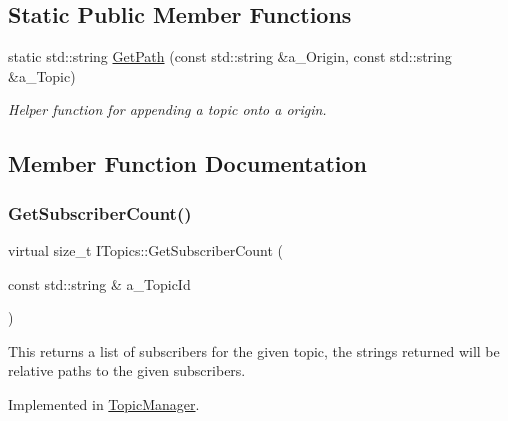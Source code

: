 \subsection*{Static Public Member Functions}
\begin{DoxyCompactItemize}
\item 
\mbox{\label{class_i_topics_a73be27c489a5f26e044e2da65979613f}} 
static std\+::string \hyperlink{class_i_topics_a73be27c489a5f26e044e2da65979613f}{Get\+Path} (const std\+::string \&a\+\_\+\+Origin, const std\+::string \&a\+\_\+\+Topic)
\begin{DoxyCompactList}\small\item\em Helper function for appending a topic onto a origin. \end{DoxyCompactList}\end{DoxyCompactItemize}


\subsection{Member Function Documentation}
\mbox{\label{class_i_topics_a5e49b50568c300e2f3a182942a3c316d}} 
\subsubsection{\texorpdfstring{Get\+Subscriber\+Count()}{GetSubscriberCount()}}
{\footnotesize\ttfamily virtual size\+\_\+t I\+Topics\+::\+Get\+Subscriber\+Count (\begin{DoxyParamCaption}\item[{const std\+::string \&}]{a\+\_\+\+Topic\+Id }\end{DoxyParamCaption})\hspace{0.3cm}{\ttfamily [pure virtual]}}

This returns a list of subscribers for the given topic, the strings returned will be relative paths to the given subscribers. 

Implemented in \hyperlink{class_topic_manager_a7dd5e9041ac8f297f9695adf576beed0}{Topic\+Manager}.

\mbox{\label{class_i_topics_a2d0193d6be4ce0c10d4bf352c21eb56a}} 
